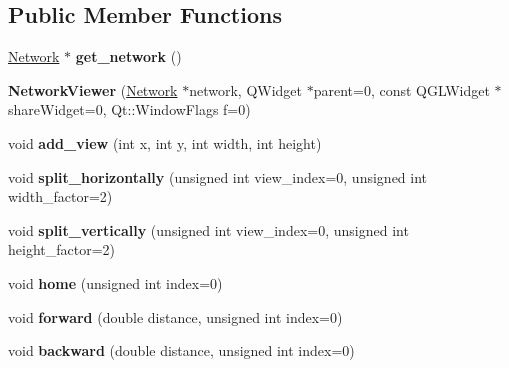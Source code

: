 \subsection*{Public Member Functions}
\begin{DoxyCompactItemize}
\item 
\hypertarget{classNetworkViewer_aaf994e08d9ddf05c795762d093cf182b}{\hyperlink{classNetwork}{Network} $\ast$ {\bfseries get\-\_\-network} ()}\label{classNetworkViewer_aaf994e08d9ddf05c795762d093cf182b}

\item 
\hypertarget{classNetworkViewer_a0621900d2fe95a2a300875c8d0ff4c51}{{\bfseries Network\-Viewer} (\hyperlink{classNetwork}{Network} $\ast$network, Q\-Widget $\ast$parent=0, const Q\-G\-L\-Widget $\ast$share\-Widget=0, Qt\-::\-Window\-Flags f=0)}\label{classNetworkViewer_a0621900d2fe95a2a300875c8d0ff4c51}

\item 
\hypertarget{classNetworkViewer_aa2f63ab66d75cd2a380912d784982431}{void {\bfseries add\-\_\-view} (int x, int y, int width, int height)}\label{classNetworkViewer_aa2f63ab66d75cd2a380912d784982431}

\item 
\hypertarget{classNetworkViewer_ac46772e2b7880456c11b49b31c3f7ac3}{void {\bfseries split\-\_\-horizontally} (unsigned int view\-\_\-index=0, unsigned int width\-\_\-factor=2)}\label{classNetworkViewer_ac46772e2b7880456c11b49b31c3f7ac3}

\item 
\hypertarget{classNetworkViewer_aa9fa6833eca3a8ef7895899d7650a8d5}{void {\bfseries split\-\_\-vertically} (unsigned int view\-\_\-index=0, unsigned int height\-\_\-factor=2)}\label{classNetworkViewer_aa9fa6833eca3a8ef7895899d7650a8d5}

\item 
\hypertarget{classNetworkViewer_aee18b6c7626299d9d506f277e31f8d8a}{void {\bfseries home} (unsigned int index=0)}\label{classNetworkViewer_aee18b6c7626299d9d506f277e31f8d8a}

\item 
\hypertarget{classNetworkViewer_a6d5b973c63f14d0f7ae82458bcf0b8dc}{void {\bfseries forward} (double distance, unsigned int index=0)}\label{classNetworkViewer_a6d5b973c63f14d0f7ae82458bcf0b8dc}

\item 
\hypertarget{classNetworkViewer_a2ad8f6a1171116276c0b1ab4759d33d5}{void {\bfseries backward} (double distance, unsigned int index=0)}\label{classNetworkViewer_a2ad8f6a1171116276c0b1ab4759d33d5}


\end{DoxyCompactItemize}
